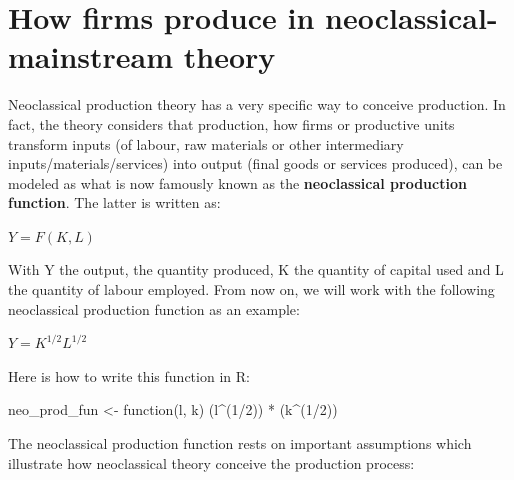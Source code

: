 \documentclass[
  letterpaper,
  DIV=11,
  numbers=noendperiod]{scrreprt}
\newenvironment{Shaded}{\begin{snugshade}}{\end{snugshade}}
\newcommand{\ControlFlowTok}[1]{\textcolor[rgb]{0.00,0.23,0.31}{#1}}
\newcommand{\DecValTok}[1]{\textcolor[rgb]{0.68,0.00,0.00}{#1}}
\newcommand{\NormalTok}[1]{\textcolor[rgb]{0.00,0.23,0.31}{#1}}
\newcommand{\OtherTok}[1]{\textcolor[rgb]{0.00,0.23,0.31}{#1}}
\newcommand{\SpecialCharTok}[1]{\textcolor[rgb]{0.37,0.37,0.37}{#1}}
\begin{document}
\hypertarget{how-firms-produce-in-neoclassical-mainstream-theory}{%
\section{How firms produce in neoclassical-mainstream
theory}\label{how-firms-produce-in-neoclassical-mainstream-theory}}

Neoclassical production theory has a very specific way to conceive
production. In fact, the theory considers that production, how firms or
productive units transform inputs (of labour, raw materials or other
intermediary inputs/materials/services) into output (final goods or
services produced), can be modeled as what is now famously known as the
\textbf{neoclassical production function}. The latter is written as:

\(Y = F(K,L)\)

With Y the output, the quantity produced, K the quantity of capital used
and L the quantity of labour employed. From now on, we will work with
the following neoclassical production function as an example:

\(Y = K^{1/2}L^{1/2}\)

Here is how to write this function in R:

\begin{Shaded}
\begin{Highlighting}[]
\NormalTok{neo\_prod\_fun }\OtherTok{\textless{}{-}} \ControlFlowTok{function}\NormalTok{(l, k) (l}\SpecialCharTok{\^{}}\NormalTok{(}\DecValTok{1}\SpecialCharTok{/}\DecValTok{2}\NormalTok{)) }\SpecialCharTok{*}\NormalTok{ (k}\SpecialCharTok{\^{}}\NormalTok{(}\DecValTok{1}\SpecialCharTok{/}\DecValTok{2}\NormalTok{))}
\end{Highlighting}
\end{Shaded}

The neoclassical production function rests on important assumptions
which illustrate how neoclassical theory conceive the production
process:
\end{document}
